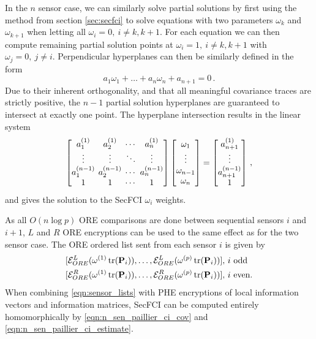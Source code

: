 \documentclass[letterpaper, 10 pt, journal, twoside]{ieeetran}  %
\begin{document}
In the $n$ sensor case, we can similarly solve partial solutions by first using the method from section \ref{sec:secfci} to solve equations with two parameters $\omega_k$ and $\omega_{k+1}$ when letting all $\omega_i=0,\ i\neq k,k+1$. For each equation we can then compute remaining partial solution points at $\omega_i=1,\ i\neq k,k+1$ with $\omega_j=0,\ j\neq i$. Perpendicular hyperplanes can then be similarly defined in the form 
\begin{equation}
   a_1\omega_1 + \dots +a_n\omega_n + a_{n+1} = 0\,. \label{eqn:nsen_plane_eq}
\end{equation}
Due to their inherent orthogonality, and that all meaningful covariance traces are strictly positive, the $n-1$ partial solution hyperplanes are guaranteed to intersect at exactly one point. The hyperplane intersection results in the linear system 
\begin{equation}
   \begingroup
   \setlength\arraycolsep{2pt}
   \begin{bmatrix}
      a_1^{(1)} & a_2^{(1)} & \cdots & a_{n}^{(1)} \\
      \vdots & \vdots & \ddots & \vdots \\
      a_1^{(n-1)} & a_2^{(n-1)} & \cdots & a_{n}^{(n-1)} \\
      1 & 1 & \cdots & 1
   \end{bmatrix}
   \begin{bmatrix}
      \omega_1 \\
      \vdots \\
      \omega_{n-1} \\
      \omega_{n}
   \end{bmatrix}
   =
   \begin{bmatrix}
      a_{n+1}^{(1)} \\
      \vdots \\
      a_{n+1}^{(n-1)} \\
      1
   \end{bmatrix}\,, \label{eqn:hyperplane_sol_eq}
   \endgroup
\end{equation}
and gives the solution to the SecFCI $\omega_i$ weights.

As all $O(n\log{p})$ ORE comparisons are done between sequential sensors $i$ and $i+1$, $L$ and $R$ ORE encryptions can be used to the same effect as for the two sensor case. The ORE ordered list sent from each sensor $i$ is given by
\begin{equation}
   \begin{aligned} \label{eqn:sensor_lists}
      &[\mathcal{E}^L_{ORE}(\omega^{(1)}\operatorname{tr}({{\mathbf{P}}}_i)),\dots,\mathcal{E}^L_{ORE}(\omega^{(p)}\operatorname{tr}({{\mathbf{P}}}_i))],\,i\text{ odd} \\
      &[\mathcal{E}^R_{ORE}(\omega^{(1)}\operatorname{tr}({{\mathbf{P}}}_i)),\dots,\mathcal{E}^R_{ORE}(\omega^{(p)}\operatorname{tr}({{\mathbf{P}}}_i))],\,i\text{ even}.
   \end{aligned}
\end{equation}
When combining \eqref{eqn:sensor_lists} with PHE encryptions of local information vectors and information matrices, SecFCI can be computed entirely homomorphically by \eqref{eqn:n_sen_paillier_ci_cov} and \eqref{eqn:n_sen_paillier_ci_estimate}.
\end{document}
